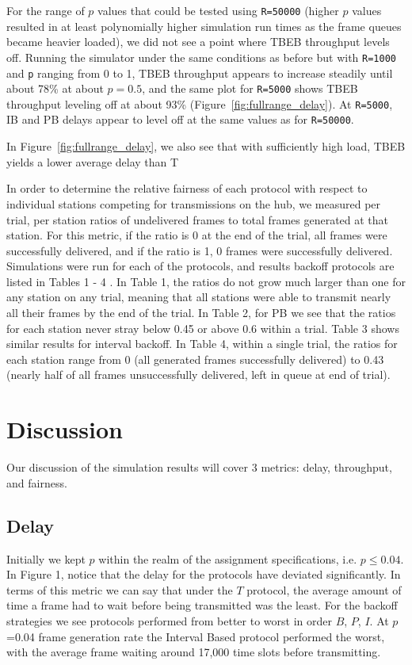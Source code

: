 \documentclass[twocolumn]{article}
\begin{document}
For the range of $p$ values that could be tested using \verb|R=50000| (higher
$p$ values resulted in at least polynomially higher simulation run times as the frame queues
became heavier loaded), we did not see a point where TBEB throughput levels off. Running
the simulator under the same conditions as before but with \verb|R=1000| and \verb|p| ranging
from 0 to 1, TBEB throughput appears to increase steadily until about 78\% at about $p = 0.5$,
and the same plot for \verb|R=5000| shows TBEB throughput leveling off at about 93\% 
(Figure~\ref{fig:fullrange_delay}). At \verb|R=5000|, IB and PB delays appear to level off at the
same values as for \verb|R=50000|.

In Figure~\ref{fig:fullrange_delay}, we also see that with sufficiently high load, TBEB yields
a lower average delay than T

In order to determine the relative fairness of each protocol with respect to individual stations
competing for transmissions on the hub, we measured per trial, per station ratios of 
undelivered frames to total frames generated at that station. For this metric, if the ratio
is 0 at the end of the trial, all frames were successfully delivered, and if the ratio is 1, 0
frames were successfully delivered. Simulations were run for
each of the protocols, and results 
backoff protocols are listed in Tables 1 - 4 . In Table 1, the ratios do not grow much larger 
than one for any station on any trial, meaning that all stations were able to transmit
nearly all their frames by the end of the trial. In Table 2, for PB we see that the
ratios for each station never stray below 0.45 or above 0.6 within a trial. Table 3 shows
similar results for interval backoff. In Table 4,
within a single trial, the ratios for each station range from 0 (all generated frames 
successfully delivered) to 0.43 (nearly half of all frames unsuccessfully delivered, left
in queue at end of trial).



\section*{Discussion}
Our discussion of the simulation results will cover 3 metrics: delay, throughput, and fairness.

\subsection*{Delay} Initially we kept $p$ within the realm of the assignment specifications,
i.e. $p \leq 0.04$. In Figure 1, notice that the delay for the protocols have deviated
significantly. In terms of this metric we can say that under the $T$ protocol, the average
amount of time a frame had to wait before being transmitted was the least. For the backoff
strategies we see protocols performed from better to worst in order $B$, $P$, $I$. At $p$=0.04
frame generation rate the Interval Based protocol performed the worst, with the average frame
waiting around 17,000 time slots before transmitting.
\end{document}
